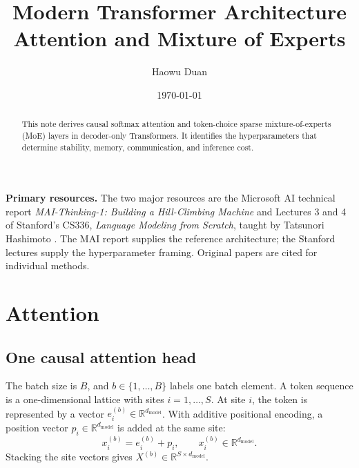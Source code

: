 \documentclass[11pt]{article}
\title{Modern Transformer Architecture\\
\large Attention and Mixture of Experts}
\author{Haowu Duan}
\date{\today}
\newcommand{\R}{\mathbb{R}}
\begin{document}
\maketitle

\begin{abstract}
This note derives causal softmax attention and token-choice sparse
mixture-of-experts (MoE) layers in decoder-only Transformers.  It identifies the
hyperparameters that determine stability, memory, communication, and inference cost.
\end{abstract}

\textbf{Primary resources.}
The two major resources are the Microsoft AI technical report
\emph{MAI-Thinking-1: Building a Hill-Climbing Machine}
\citep{microsoftai2026maithinking} and Lectures 3 and 4 of Stanford's CS336,
\emph{Language Modeling from Scratch}, taught by Tatsunori Hashimoto
\citep{hashimoto2026architecture,hashimoto2026attentionmoe}.  The MAI report supplies
the reference architecture; the Stanford lectures supply the hyperparameter framing.
Original papers are cited for individual methods.

\vspace{1em}
\noindent{}

\clearpage
\tableofcontents
\clearpage

\section{Attention}

\subsection{One causal attention head}

The batch size is $B$, and $b\in\{1,\ldots,B\}$ labels one batch element.
A token sequence is a one-dimensional lattice with sites
$i=1,\ldots,S$.  At site $i$, the token is represented by a vector
$e_i^{(b)}\in\R^{d_{\mathrm{model}}}$.  With additive positional encoding, a
position vector $p_i\in\R^{d_{\mathrm{model}}}$ is added at the same site:
\begin{equation}
  x_i^{(b)}=e_i^{(b)}+p_i,
  \qquad
  x_i^{(b)}\in\R^{d_{\mathrm{model}}}.
  \label{eq:additive-position}
\end{equation}
Stacking the site vectors gives
$X^{(b)}\in\R^{S\times d_{\mathrm{model}}}$.
\end{document}
